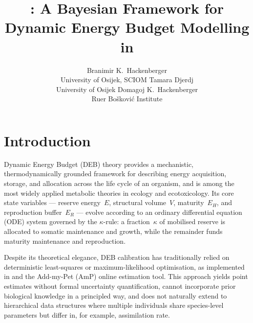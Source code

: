 \documentclass[article,shortnames]{jss}
\author{Branimir K.~Hackenberger\\University of Osijek, SCIOM \And
        Tamara Djerdj\\University of Osijek \And
        Domagoj K.~Hackenberger\\Ru{\dj}er Bo{\v s}kovi{\'c} Institute}
\title{\pkg{BayesianDEB}: A Bayesian Framework for Dynamic Energy
       Budget Modelling in \proglang{R}}
\begin{document}
\section{Introduction} \label{sec:intro}

Dynamic Energy Budget (DEB) theory \citep{Kooijman2010,
NisbetDEB2000, SousaDEB2008} provides a
mechanistic, thermodynamically grounded framework for describing
energy acquisition, storage, and allocation across the life cycle
of an organism, and is among the most widely applied metabolic
theories in ecology and ecotoxicology.  Its core state variables
--- reserve energy~$E$, structural volume~$V$, maturity~$E_H$, and
reproduction buffer~$E_R$ --- evolve according to an ordinary
differential equation (ODE) system governed by the $\kappa$-rule:
a fraction~$\kappa$ of mobilised reserve is allocated to somatic
maintenance and growth, while the remainder funds maturity maintenance
and reproduction.

Despite its theoretical elegance, DEB calibration has traditionally
relied on deterministic least-squares or maximum-likelihood
optimisation, as implemented in 
\citep{MarquesAmP2018} and the Add-my-Pet (AmP) online estimation
tool.  This approach yields point estimates without formal uncertainty
quantification, cannot incorporate prior biological knowledge in a
principled way, and does not naturally extend to hierarchical data
structures where multiple individuals share species-level parameters
but differ in, for example, assimilation rate.
\end{document}
